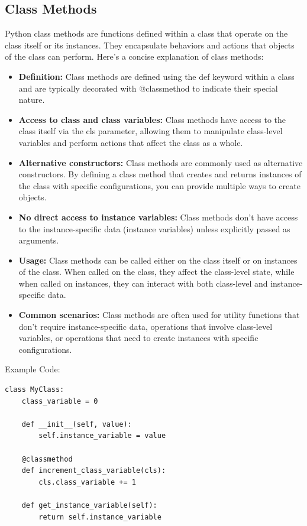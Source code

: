 \documentclass{report}
\begin{document}
    \pagebreak \bigbreak \noindent
    \subsection{Class Methods}
    \bigbreak \noindent 
    Python class methods are functions defined within a class that operate on the class itself or its instances. They encapsulate behaviors and actions that objects of the class can perform. Here's a concise explanation of class methods:
    \begin{itemize}
        \item \textbf{Definition:} Class methods are defined using the def keyword within a class and are typically decorated with @classmethod to indicate their special nature.
        \item \textbf{Access to class and class variables:} Class methods have access to the class itself via the cls parameter, allowing them to manipulate class-level variables and perform actions that affect the class as a whole.
        \item \textbf{Alternative constructors:} Class methods are commonly used as alternative constructors. By defining a class method that creates and returns instances of the class with specific configurations, you can provide multiple ways to create objects.
        \item \textbf{No direct access to instance variables:} Class methods don't have access to the instance-specific data (instance variables) unless explicitly passed as arguments.
        \item \textbf{Usage:} Class methods can be called either on the class itself or on instances of the class. When called on the class, they affect the class-level state, while when called on instances, they can interact with both class-level and instance-specific data.
        \item \textbf{Common scenarios:} Class methods are often used for utility functions that don't require instance-specific data, operations that involve class-level variables, or operations that need to create instances with specific configurations.
    \end{itemize}
    \bigbreak \noindent 
    Example Code:
    \begin{verbatim}
class MyClass:
    class_variable = 0

    def __init__(self, value):
        self.instance_variable = value

    @classmethod
    def increment_class_variable(cls):
        cls.class_variable += 1

    def get_instance_variable(self):
        return self.instance_variable
    \end{verbatim}
\end{document}
